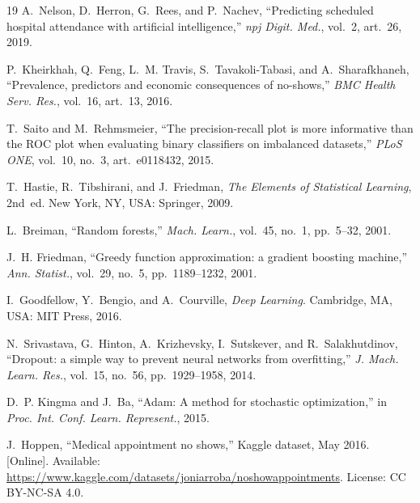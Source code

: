 \documentclass[conference]{IEEEtran}
\begin{document}
\begin{thebibliography}{19}
A.~Nelson, D.~Herron, G.~Rees, and P.~Nachev, ``Predicting scheduled hospital attendance with artificial intelligence,'' \emph{npj Digit. Med.}, vol.~2, art.~26, 2019.

P.~Kheirkhah, Q.~Feng, L.~M. Travis, S.~Tavakoli-Tabasi, and A.~Sharafkhaneh, ``Prevalence, predictors and economic consequences of no-shows,'' \emph{BMC Health Serv. Res.}, vol.~16, art.~13, 2016.

T.~Saito and M.~Rehmsmeier, ``The precision-recall plot is more informative than the ROC plot when evaluating binary classifiers on imbalanced datasets,'' \emph{PLoS ONE}, vol.~10, no.~3, art.~e0118432, 2015.

T.~Hastie, R.~Tibshirani, and J.~Friedman, \emph{The Elements of Statistical Learning}, 2nd~ed. New York, NY, USA: Springer, 2009.

L.~Breiman, ``Random forests,'' \emph{Mach. Learn.}, vol.~45, no.~1, pp.~5--32, 2001.

J.~H. Friedman, ``Greedy function approximation: a gradient boosting machine,'' \emph{Ann. Statist.}, vol.~29, no.~5, pp.~1189--1232, 2001.

I.~Goodfellow, Y.~Bengio, and A.~Courville, \emph{Deep Learning}. Cambridge, MA, USA: MIT Press, 2016.

N.~Srivastava, G.~Hinton, A.~Krizhevsky, I.~Sutskever, and R.~Salakhutdinov, ``Dropout: a simple way to prevent neural networks from overfitting,'' \emph{J. Mach. Learn. Res.}, vol.~15, no.~56, pp.~1929--1958, 2014.

D.~P. Kingma and J.~Ba, ``Adam: A method for stochastic optimization,'' in \emph{Proc. Int. Conf. Learn. Represent.}, 2015.

J.~Hoppen, ``Medical appointment no shows,'' Kaggle dataset, May 2016. [Online]. Available: \url{https://www.kaggle.com/datasets/joniarroba/noshowappointments}. License: CC BY-NC-SA 4.0.
\end{thebibliography}
\end{document}
